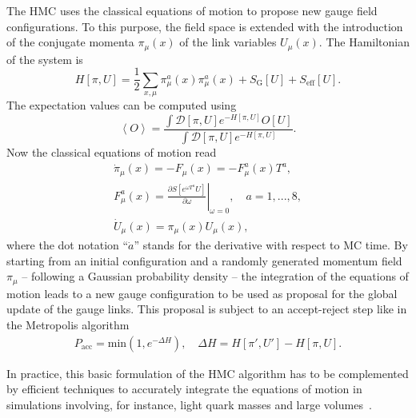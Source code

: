 The HMC uses the classical equations of motion to propose new gauge field configurations. To this purpose, the field space is extended with the introduction of the conjugate momenta $\pi_{\mu}(x)$ of the link variables $U_{\mu}(x)$. The Hamiltonian of the system is
\begin{equation}
H[\pi,U]=\frac{1}{2}\sum_{x,\mu}\pi_{\mu}^a(x)\pi_{\mu}^a(x)+S_{\textrm{G}}[U]+S_{\textrm{eff}}[U].
\end{equation}
The expectation values can be computed using
\begin{equation}
\left<O\right>=\frac{\int\mathcal{D}[\pi,U]e^{-H[\pi,U]}O[U]}{\int\mathcal{D}[\pi,U]e^{-H[\pi,U]}}.
\end{equation}
Now the classical equations of motion read
\begin{gather}
\dot{\pi}_{\mu}(x)=-F_{\mu}(x)=-F_{\mu}^a(x)T^a, \\
F_{\mu}^a(x)=\left.\frac{\partial S[e^{\omega T^a}U]}{\partial\omega}\right|_{\omega=0}, \quad a=1,...,8, \\
\dot{U}_{\mu}(x)=\pi_{\mu}(x)U_{\mu}(x),
\end{gather}
where the dot notation ``$\dot{a}$'' stands for the derivative with respect to MC time. By starting from an initial configuration and a randomly generated 
momentum field $\pi_{\mu}$ -- following a Gaussian  probability
density -- the integration of the equations of motion leads to a new gauge configuration to be used as proposal for the global update of the gauge links. This proposal is subject to an accept-reject step like in the Metropolis algorithm
\begin{gather}
P_{\textrm{acc}}=\textrm{min}\left(1,e^{-\Delta H}\right), \quad \Delta H=H[\pi',U']-H[\pi,U].
\end{gather}

In practice, this basic formulation of the HMC algorithm has to be complemented by efficient techniques to accurately integrate the equations of motion in simulations involving, for instance, light quark masses and large volumes~\citep{Weingarten:1991ra,OMELYAN2003272,Hasenbusch:2001ne}.

